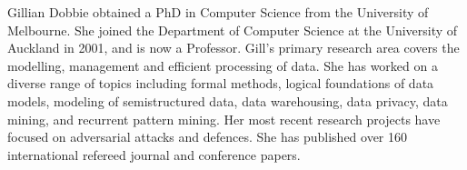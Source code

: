 \documentclass[10pt,journal,compsoc]{IEEEtran}
\begin{document}
\begin{IEEEbiography}{Gillian Dobbie}
obtained a PhD in Computer Science from the University of Melbourne. She joined the Department of Computer Science at the University of Auckland in 2001, and is now a Professor. Gill’s primary research area covers  the modelling, management and efficient processing of data. She has worked on a diverse range of topics including formal methods, logical foundations of data models, modeling of semistructured data, data warehousing, data privacy, data mining, and recurrent pattern mining. Her most recent research projects have focused on adversarial attacks and defences. She has published over 160 international refereed journal and conference papers. 
\end{IEEEbiography}


\end{document}
